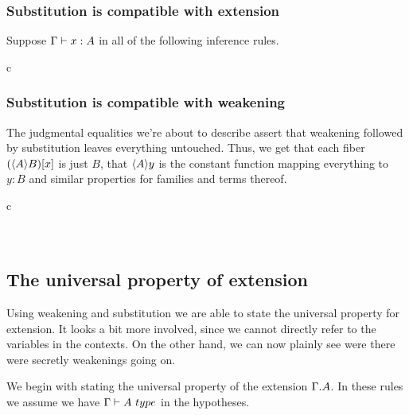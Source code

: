 \subsubsection{Substitution is compatible with extension}
Suppose $\jterm{\Gamma}{A}{x}$ in all of the following inference rules.
\begin{infarray}{c}
\end{infarray}

\subsubsection{Substitution is compatible with weakening}
The judgmental equalities we're about to describe assert that weakening followed
by substitution leaves everything untouched. Thus, we get that each fiber
$\subst{x}{\ctxwk{A}{B}}$ is just $B$, that $\ctxwk{A}{y}$ is the constant function
mapping everything to $y:B$ and similar properties for families and terms thereof.

\begin{infarray}{c}
\\
\\
\\
\end{infarray}

\subsection{The universal property of extension}

Using weakening and substitution we are able to state the universal property
for extension. It looks a bit more involved, since we cannot directly refer
to the variables in the contexts. On the other hand, we can now plainly see
were there were secretly weakenings going on.

We begin with stating the universal property of the extension $\ctxext{\Gamma}{A}$.
In these rules we assume we have $\jtype{\Gamma}{A}$ in the hypotheses.

